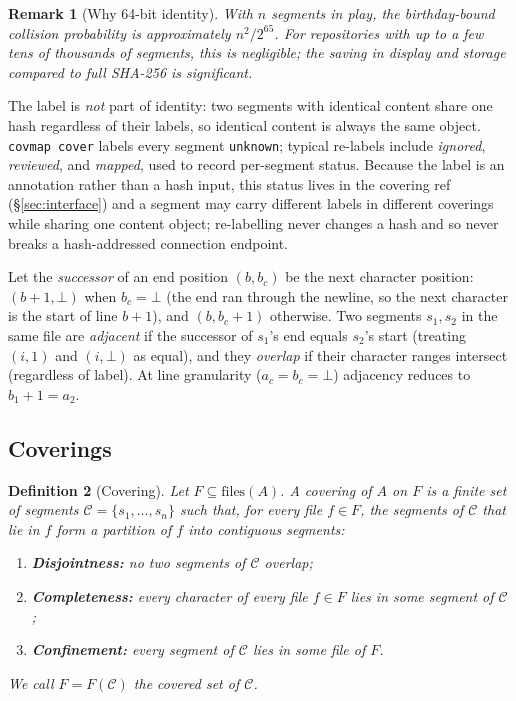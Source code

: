 \documentclass[11pt,a4paper]{article}
\newtheorem{definition}{Definition}[section]
\newtheorem{remark}[definition]{Remark}
\newcommand{\Cov}{\mathcal{C}}
\begin{document}
\begin{remark}[Why 64-bit identity]
With $n$ segments in play, the birthday-bound collision probability
is approximately $n^2 / 2^{65}$. For repositories with up to a few
tens of thousands of segments, this is negligible; the saving in
display and storage compared to full SHA-256 is significant.
\end{remark}

The label is \emph{not} part of identity: two segments with identical
content share one hash regardless of their labels, so identical content
is always the same object. \texttt{covmap cover} labels every segment
\texttt{unknown}; typical re-labels include \emph{ignored},
\emph{reviewed}, and \emph{mapped}, used to record per-segment status.
Because the label is an annotation rather than a hash input, this status
lives in the covering ref (\S\ref{sec:interface}) and a segment may carry
different labels in different coverings while sharing one content object;
re-labelling never changes a hash and so never breaks a hash-addressed
connection endpoint.

Let the \emph{successor} of an end position $(b, b_c)$ be the next
character position: $(b+1, \bot)$ when $b_c = \bot$ (the end ran
through the newline, so the next character is the start of line
$b+1$), and $(b, b_c + 1)$ otherwise. Two segments $s_1, s_2$ in the
same file are \emph{adjacent} if the successor of $s_1$'s end equals
$s_2$'s start (treating $(i,1)$ and $(i,\bot)$ as equal), and they
\emph{overlap} if their character ranges intersect (regardless of
label). At line granularity ($a_c = b_c = \bot$) adjacency reduces to
$b_1 + 1 = a_2$.

\subsection{Coverings}

\begin{definition}[Covering]\label{def:covering}
Let $F \subseteq \mathrm{files}(A)$. A \emph{covering of $A$ on $F$}
is a finite set of segments $\Cov = \{s_1, \dots, s_n\}$ such that,
for every file $f \in F$, the segments of $\Cov$ that lie in $f$ form
a partition of $f$ into contiguous segments:
\begin{enumerate}[label=(C\arabic*),leftmargin=2.5em]
\item \textbf{Disjointness:} no two segments of $\Cov$ overlap;
\item \textbf{Completeness:} every character of every file $f \in F$
      lies in some segment of $\Cov$;
\item \textbf{Confinement:} every segment of $\Cov$ lies in some
      file of $F$.
\end{enumerate}
We call $F = F(\Cov)$ the \emph{covered set} of $\Cov$.
\end{definition}
\end{document}
